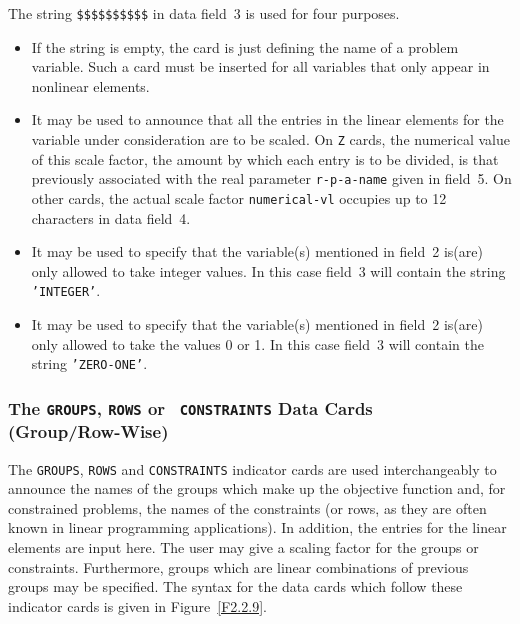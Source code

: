 \documentclass[a4paper]{article}
\begin{document}
The string {\tt \$\$\$\$\$\$\$\$\$\$} in  data field~3 is used for four
purposes.
\begin{itemize}
\item
If  the string is  empty,  the card is  just  defining  the  name
of a problem variable.
Such  a card
must be inserted  for all  variables that only  appear in
nonlinear elements.

\item
It may be used to announce that all the entries in the linear elements
for the variable  under consideration are  to be  scaled.
On {\tt Z} cards,
the numerical value of this scale factor, the amount
by  which each entry is to  be divided, is  that previously associated
with the real parameter {\tt r-p-a-name}  given in field~5.   On other
cards,
the actual scale factor {\tt  numerical-vl}  occupies up to 12
characters in data field~4.
\item
It may be  used  to specify  that  the  variable(s) mentioned  in field~2
is(are) only allowed to take integer values. In this case field~3 will
contain the string {\tt 'INTEGER'}.
\item
It may be  used  to specify  that  the  variable(s) mentioned  in field~2
is(are) only allowed to take the values 0 or 1. In this case field~3 will
contain the string {\tt 'ZERO-ONE'}.
\end{itemize}

\subsubsection[The {\tt GROUPS}, {\tt ROWS} or {\tt CONSTRAINTS} Data Cards
 (Group/Row-Wise)]{\label{S2.2.9}The {\tt GROUPS}, {\tt ROWS} or {\tt
CONSTRAINTS} Data Cards  \protect\\ (Group/Row-Wise)}

The {\tt GROUPS}, {\tt ROWS} and {\tt CONSTRAINTS} indicator cards
are used interchangeably to announce the names of the groups
which make up
the objective function
and, for constrained
problems, the names of the
constraints (or rows,  as  they are often  known  in linear programming
applications).
In  addition, the entries  for the linear  elements
are input here.  The user may give a scaling factor  for the groups or
constraints.
Furthermore, groups  which  are linear  combinations  of
previous groups may be specified. The syntax  for the data cards
which follow these indicator cards
is given in Figure~\ref{F2.2.9}.
\end{document}
